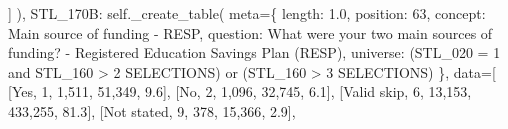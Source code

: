 \documentclass[
  11pt,
  a4paper,
]{article}
\newenvironment{Shaded}{\begin{snugshade}}{\end{snugshade}}
\newcommand{\NormalTok}[1]{\textcolor[rgb]{0.00,0.23,0.31}{#1}}
\newcommand{\OperatorTok}[1]{\textcolor[rgb]{0.37,0.37,0.37}{#1}}
\newcommand{\StringTok}[1]{\textcolor[rgb]{0.13,0.47,0.30}{#1}}
\newcommand{\VariableTok}[1]{\textcolor[rgb]{0.07,0.07,0.07}{#1}}
\begin{document}
\begin{Shaded}
\begin{Highlighting}[]
\NormalTok{                ]}
\NormalTok{            ),}
            \StringTok{\textquotesingle{}STL\_170B\textquotesingle{}}\NormalTok{: }\VariableTok{self}\NormalTok{.\_create\_table(}
\NormalTok{                meta}\OperatorTok{=}\NormalTok{\{}
                    \StringTok{\textquotesingle{}length\textquotesingle{}}\NormalTok{: }\StringTok{\textquotesingle{}1.0\textquotesingle{}}\NormalTok{, }\StringTok{\textquotesingle{}position\textquotesingle{}}\NormalTok{: }\StringTok{\textquotesingle{}63\textquotesingle{}}\NormalTok{,}
                    \StringTok{\textquotesingle{}concept\textquotesingle{}}\NormalTok{: }\StringTok{\textquotesingle{}Main source of funding {-} RESP\textquotesingle{}}\NormalTok{,}
                    \StringTok{\textquotesingle{}question\textquotesingle{}}\NormalTok{: }\StringTok{\textquotesingle{}What were your two main sources of funding? {-} Registered Education Savings Plan (RESP)\textquotesingle{}}\NormalTok{,}
                    \StringTok{\textquotesingle{}universe\textquotesingle{}}\NormalTok{: }\StringTok{\textquotesingle{}(STL\_020 = 1 and STL\_160 \textgreater{} 2 SELECTIONS) or (STL\_160 \textgreater{} 3 SELECTIONS)\textquotesingle{}}
\NormalTok{                \},}
\NormalTok{                data}\OperatorTok{=}\NormalTok{[}
\NormalTok{                    [}\StringTok{\textquotesingle{}Yes\textquotesingle{}}\NormalTok{, }\StringTok{\textquotesingle{}1\textquotesingle{}}\NormalTok{, }\StringTok{\textquotesingle{}1,511\textquotesingle{}}\NormalTok{, }\StringTok{\textquotesingle{}51,349\textquotesingle{}}\NormalTok{, }\StringTok{\textquotesingle{}9.6\textquotesingle{}}\NormalTok{],}
\NormalTok{                    [}\StringTok{\textquotesingle{}No\textquotesingle{}}\NormalTok{, }\StringTok{\textquotesingle{}2\textquotesingle{}}\NormalTok{, }\StringTok{\textquotesingle{}1,096\textquotesingle{}}\NormalTok{, }\StringTok{\textquotesingle{}32,745\textquotesingle{}}\NormalTok{, }\StringTok{\textquotesingle{}6.1\textquotesingle{}}\NormalTok{],}
\NormalTok{                    [}\StringTok{\textquotesingle{}Valid skip\textquotesingle{}}\NormalTok{, }\StringTok{\textquotesingle{}6\textquotesingle{}}\NormalTok{, }\StringTok{\textquotesingle{}13,153\textquotesingle{}}\NormalTok{, }\StringTok{\textquotesingle{}433,255\textquotesingle{}}\NormalTok{, }\StringTok{\textquotesingle{}81.3\textquotesingle{}}\NormalTok{],}
\NormalTok{                    [}\StringTok{\textquotesingle{}Not stated\textquotesingle{}}\NormalTok{, }\StringTok{\textquotesingle{}9\textquotesingle{}}\NormalTok{, }\StringTok{\textquotesingle{}378\textquotesingle{}}\NormalTok{, }\StringTok{\textquotesingle{}15,366\textquotesingle{}}\NormalTok{, }\StringTok{\textquotesingle{}2.9\textquotesingle{}}\NormalTok{],}

\end{Highlighting}
\end{Shaded}
\end{document}
